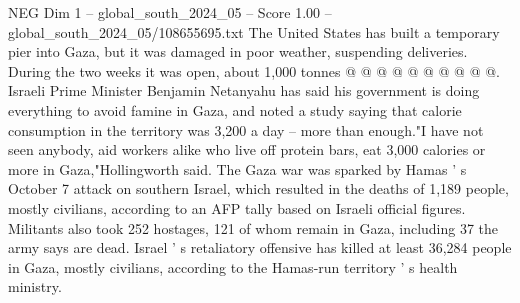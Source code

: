 \begin{textsample}{NEG Dim 1 – global\_south\_2024\_05 – Score 1.00 – global\_south\_2024\_05/108655695.txt}
The United States has built a temporary pier into Gaza, but it was damaged in poor weather, suspending deliveries.
During the two weeks it was open, about 1,000 tonnes @ @ @ @ @ @ @ @ @ @.
Israeli Prime Minister Benjamin Netanyahu has said his government is doing everything to avoid famine in Gaza, and noted a study saying that calorie consumption in the territory was 3,200 a day -- more than enough."I have not seen anybody, aid workers alike who live off protein bars, eat 3,000 calories or more in Gaza,"Hollingworth said.
The Gaza war was sparked by Hamas ' s October 7 attack on southern Israel, which resulted in the deaths of 1,189 people, mostly civilians, according to an AFP tally based on Israeli official figures.
Militants also took 252 hostages, 121 of whom remain in Gaza, including 37 the army says are dead.
Israel ' s retaliatory offensive has killed at least 36,284 people in Gaza, mostly civilians, according to the Hamas-run territory ' s health ministry.

\end{textsample}

